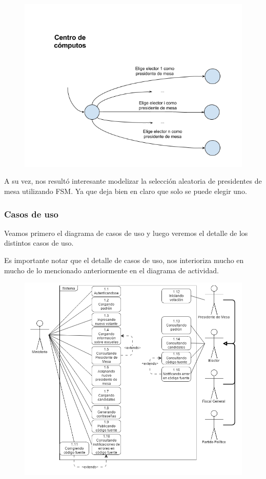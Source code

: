 \begin{figure}[h!]
\centering
\includegraphics[scale=0.45]{imagenes/FSMs/Preparacion/Eleccionaleatoria}
\end{figure}

A su vez, nos resultó interesante modelizar la selección aleatoria de presidentes de mesa utilizando FSM. Ya que deja bien en claro que solo se puede elegir uno.

\subsubsection{Casos de uso}

Veamos primero el diagrama de casos de uso y luego veremos el detalle de los distintos casos de uso.


Es importante notar que el detalle de casos de uso, nos interioriza mucho en mucho de lo mencionado anteriormente en el diagrama de actividad. 


\begin{figure}[h!]
\centering
\includegraphics[scale=0.45]{imagenes/CU/casosdeusopreparacion}
\end{figure}

